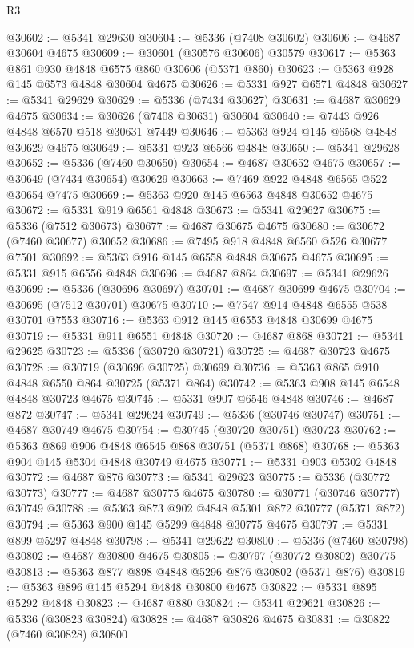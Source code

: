 \begin{lexlean}{R3}
\begin{coremodule}
@30602 := @5341 @29630
@30604 := @5336 (@7408 @30602)
@30606 := @4687 @30604 @4675
@30609 := @30601 (@30576 @30606) @30579
@30617 := @5363 @861 @930 @4848 @6575 @860 @30606 (@5371 @860)
@30623 := @5363 @928 @145 @6573 @4848 @30604 @4675
@30626 := @5331 @927 @6571 @4848
@30627 := @5341 @29629
@30629 := @5336 (@7434 @30627)
@30631 := @4687 @30629 @4675
@30634 := @30626 (@7408 @30631) @30604
@30640 := @7443 @926 @4848 @6570 @518 @30631 @7449
@30646 := @5363 @924 @145 @6568 @4848 @30629 @4675
@30649 := @5331 @923 @6566 @4848
@30650 := @5341 @29628
@30652 := @5336 (@7460 @30650)
@30654 := @4687 @30652 @4675
@30657 := @30649 (@7434 @30654) @30629
@30663 := @7469 @922 @4848 @6565 @522 @30654 @7475
@30669 := @5363 @920 @145 @6563 @4848 @30652 @4675
@30672 := @5331 @919 @6561 @4848
@30673 := @5341 @29627
@30675 := @5336 (@7512 @30673)
@30677 := @4687 @30675 @4675
@30680 := @30672 (@7460 @30677) @30652
@30686 := @7495 @918 @4848 @6560 @526 @30677 @7501
@30692 := @5363 @916 @145 @6558 @4848 @30675 @4675
@30695 := @5331 @915 @6556 @4848
@30696 := @4687 @864
@30697 := @5341 @29626
@30699 := @5336 (@30696 @30697)
@30701 := @4687 @30699 @4675
@30704 := @30695 (@7512 @30701) @30675
@30710 := @7547 @914 @4848 @6555 @538 @30701 @7553
@30716 := @5363 @912 @145 @6553 @4848 @30699 @4675
@30719 := @5331 @911 @6551 @4848
@30720 := @4687 @868
@30721 := @5341 @29625
@30723 := @5336 (@30720 @30721)
@30725 := @4687 @30723 @4675
@30728 := @30719 (@30696 @30725) @30699
@30736 := @5363 @865 @910 @4848 @6550 @864 @30725 (@5371 @864)
@30742 := @5363 @908 @145 @6548 @4848 @30723 @4675
@30745 := @5331 @907 @6546 @4848
@30746 := @4687 @872
@30747 := @5341 @29624
@30749 := @5336 (@30746 @30747)
@30751 := @4687 @30749 @4675
@30754 := @30745 (@30720 @30751) @30723
@30762 := @5363 @869 @906 @4848 @6545 @868 @30751 (@5371 @868)
@30768 := @5363 @904 @145 @5304 @4848 @30749 @4675
@30771 := @5331 @903 @5302 @4848
@30772 := @4687 @876
@30773 := @5341 @29623
@30775 := @5336 (@30772 @30773)
@30777 := @4687 @30775 @4675
@30780 := @30771 (@30746 @30777) @30749
@30788 := @5363 @873 @902 @4848 @5301 @872 @30777 (@5371 @872)
@30794 := @5363 @900 @145 @5299 @4848 @30775 @4675
@30797 := @5331 @899 @5297 @4848
@30798 := @5341 @29622
@30800 := @5336 (@7460 @30798)
@30802 := @4687 @30800 @4675
@30805 := @30797 (@30772 @30802) @30775
@30813 := @5363 @877 @898 @4848 @5296 @876 @30802 (@5371 @876)
@30819 := @5363 @896 @145 @5294 @4848 @30800 @4675
@30822 := @5331 @895 @5292 @4848
@30823 := @4687 @880
@30824 := @5341 @29621
@30826 := @5336 (@30823 @30824)
@30828 := @4687 @30826 @4675
@30831 := @30822 (@7460 @30828) @30800

\end{coremodule}
\end{lexlean}
